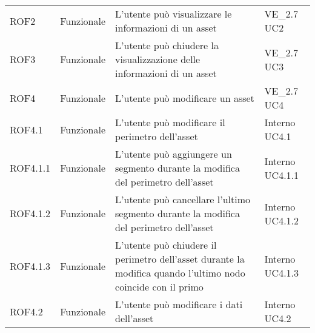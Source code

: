\begin{longtable}{p{2cm}!{\VRule[1pt]}p{2cm}!{\VRule[1pt]}p{5cm}!{\VRule[1pt]}p{1.5cm}}
	ROF2                             & Funzionale\newline               & L'utente può visualizzare le informazioni di un asset                                                                    & VE_2.7 \newline UC2          
	\\

	ROF3                             & Funzionale\newline               & L'utente può chiudere la visualizzazione delle informazioni di un asset                                                  & VE_2.7 \newline UC3          
	\\

	ROF4                             & Funzionale\newline               & L'utente può modificare un asset                                                                                         & VE_2.7 \newline UC4          
	\\
	ROF4.1                           & Funzionale\newline               & L'utente può modificare il perimetro dell'asset                                                                          & Interno \newline UC4.1       
	\\
	ROF4.1.1                         & Funzionale\newline               & L'utente può aggiungere un segmento durante la modifica del perimetro dell'asset                                         & Interno \newline UC4.1.1     
	\\
	ROF4.1.2                         & Funzionale\newline               & L'utente può cancellare l'ultimo segmento durante la modifica del perimetro dell'asset                                   & Interno \newline UC4.1.2     
	\\
	ROF4.1.3                         & Funzionale\newline               & L'utente può chiudere il perimetro dell'asset durante la modifica quando l'ultimo nodo coincide con il primo             & Interno \newline UC4.1.3     
	\\
	ROF4.2                           & Funzionale\newline               & L'utente può modificare i dati dell'asset                                                                                & Interno \newline UC4.2       

\end{longtable}
